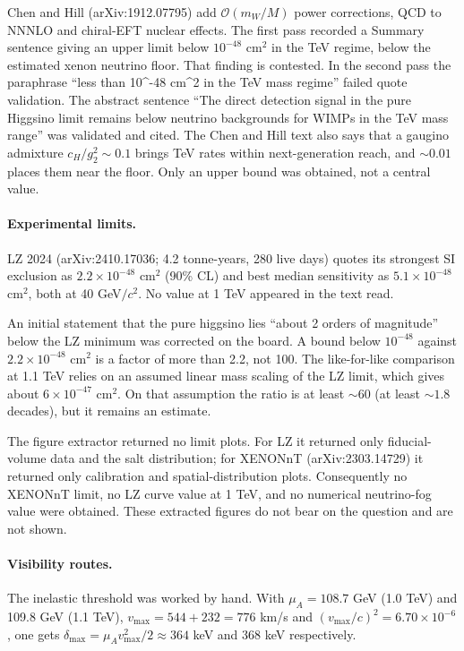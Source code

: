 \documentclass[11pt,a4paper]{article}
\begin{document}
Chen and Hill (arXiv:1912.07795) add $\mathcal{O}(m_W/M)$ power corrections, QCD to NNNLO and chiral-EFT nuclear effects. The first pass recorded a Summary sentence giving an upper limit below $10^{-48}$ cm$^2$ in the TeV regime, below the estimated xenon neutrino floor. That finding is contested. In the second pass the paraphrase ``less than 10\^{}-48 cm\^{}2 in the TeV mass regime'' failed quote validation. The abstract sentence ``The direct detection signal in the pure Higgsino limit remains below neutrino backgrounds for WIMPs in the TeV mass range'' was validated and cited. The Chen and Hill text also says that a gaugino admixture $c_H/g_2^2\sim0.1$ brings TeV rates within next-generation reach, and $\sim0.01$ places them near the floor. Only an upper bound was obtained, not a central value.

\paragraph{Experimental limits.} LZ 2024 (arXiv:2410.17036; 4.2 tonne-years, 280 live days) quotes its strongest SI exclusion as $2.2\times10^{-48}$ cm$^2$ (90\% CL) and best median sensitivity as $5.1\times10^{-48}$ cm$^2$, both at 40 GeV$/c^2$. No value at 1 TeV appeared in the text read.

An initial statement that the pure higgsino lies ``about 2 orders of magnitude'' below the LZ minimum was corrected on the board. A bound below $10^{-48}$ against $2.2\times10^{-48}$ cm$^2$ is a factor of more than 2.2, not 100. The like-for-like comparison at 1.1 TeV relies on an assumed linear mass scaling of the LZ limit, which gives about $6\times10^{-47}$ cm$^2$. On that assumption the ratio is at least $\sim60$ (at least $\sim1.8$ decades), but it remains an estimate.

The figure extractor returned no limit plots. For LZ it returned only fiducial-volume data and the salt distribution; for XENONnT (arXiv:2303.14729) it returned only calibration and spatial-distribution plots. Consequently no XENONnT limit, no LZ curve value at 1 TeV, and no numerical neutrino-fog value were obtained. These extracted figures do not bear on the question and are not shown.

\paragraph{Visibility routes.} The inelastic threshold was worked by hand. With $\mu_A=108.7$ GeV (1.0 TeV) and 109.8 GeV (1.1 TeV), $v_{\max}=544+232=776$ km/s and $(v_{\max}/c)^2=6.70\times10^{-6}$, one gets $\delta_{\max}=\mu_A v_{\max}^2/2\approx364$ keV and 368 keV respectively.
\end{document}
